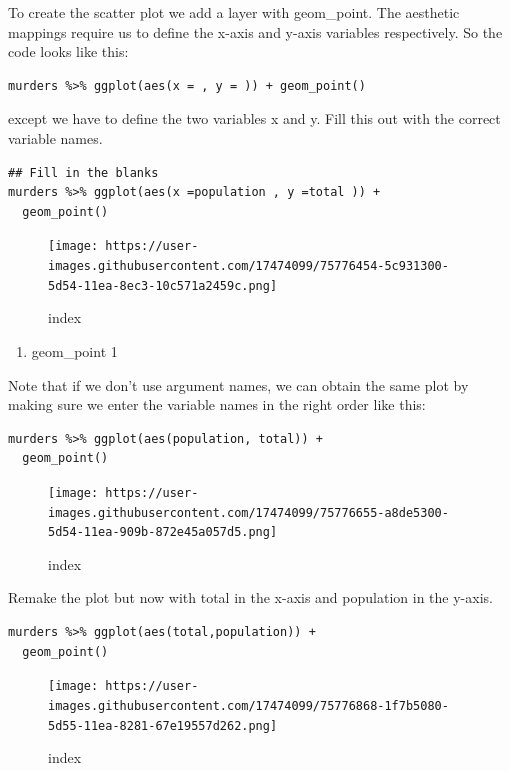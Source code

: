 \documentclass[
]{article}
\providecommand{\tightlist}{%
  \setlength{\itemsep}{0pt}\setlength{\parskip}{0pt}}
\begin{document}
To create the scatter plot we add a layer with geom\_point. The
aesthetic mappings require us to define the x-axis and y-axis variables
respectively. So the code looks like this:

\begin{verbatim}
murders %>% ggplot(aes(x = , y = )) + geom_point()
\end{verbatim}

except we have to define the two variables x and y. Fill this out with
the correct variable names.

\begin{verbatim}
## Fill in the blanks
murders %>% ggplot(aes(x =population , y =total )) +
  geom_point()
\end{verbatim}

\begin{figure}
\centering
\texttt{[image: https://user-images.githubusercontent.com/17474099/75776454-5c931300-5d54-11ea-8ec3-10c571a2459c.png]}
\caption{index}
\end{figure}

\begin{enumerate}
\def\labelenumi{\arabic{enumi}.}
\setcounter{enumi}{5}
\tightlist
\item
  geom\_point 1
\end{enumerate}

Note that if we don't use argument names, we can obtain the same plot by
making sure we enter the variable names in the right order like this:

\begin{verbatim}
murders %>% ggplot(aes(population, total)) +
  geom_point()
\end{verbatim}

\begin{figure}
\centering
\texttt{[image: https://user-images.githubusercontent.com/17474099/75776655-a8de5300-5d54-11ea-909b-872e45a057d5.png]}
\caption{index}
\end{figure}

Remake the plot but now with total in the x-axis and population in the
y-axis.

\begin{verbatim}
murders %>% ggplot(aes(total,population)) +
  geom_point()
\end{verbatim}

\begin{figure}
\centering
\texttt{[image: https://user-images.githubusercontent.com/17474099/75776868-1f7b5080-5d55-11ea-8281-67e19557d262.png]}
\caption{index}
\end{figure}
\end{document}
